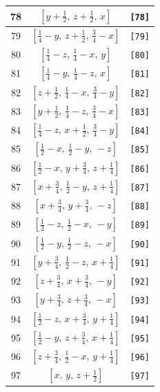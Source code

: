\documentclass[fleqn,8pt]{jsarticle}
\begin{document}
\begin{longtable}{ccc}
78 & $\left[ y + \frac{1}{2},\, z + \frac{1}{2},\, x \right]$ & {\tt [78]} \\ \hline
79 & $\left[ \frac{1}{4} - y,\, z + \frac{1}{2},\, \frac{3}{4} - x \right]$ & {\tt [79]} \\ \hline
80 & $\left[ \frac{1}{4} - z,\, \frac{1}{4} - x,\, y \right]$ & {\tt [80]} \\ \hline
81 & $\left[ \frac{1}{4} - y,\, \frac{1}{4} - z,\, x \right]$ & {\tt [81]} \\ \hline
82 & $\left[ z + \frac{1}{2},\, \frac{1}{4} - x,\, \frac{3}{4} - y \right]$ & {\tt [82]} \\ \hline
83 & $\left[ y + \frac{1}{2},\, \frac{1}{4} - z,\, \frac{3}{4} - x \right]$ & {\tt [83]} \\ \hline
84 & $\left[ \frac{1}{4} - z,\, x + \frac{1}{2},\, \frac{3}{4} - y \right]$ & {\tt [84]} \\ \hline
85 & $\left[ \frac{1}{2} - x,\, \frac{1}{2} - y,\, - z \right]$ & {\tt [85]} \\ \hline
86 & $\left[ \frac{1}{2} - x,\, y + \frac{3}{4},\, z + \frac{1}{4} \right]$ & {\tt [86]} \\ \hline
87 & $\left[ x + \frac{3}{4},\, \frac{1}{2} - y,\, z + \frac{1}{4} \right]$ & {\tt [87]} \\ \hline
88 & $\left[ x + \frac{3}{4},\, y + \frac{3}{4},\, - z \right]$ & {\tt [88]} \\ \hline
89 & $\left[ \frac{1}{2} - z,\, \frac{1}{2} - x,\, - y \right]$ & {\tt [89]} \\ \hline
90 & $\left[ \frac{1}{2} - y,\, \frac{1}{2} - z,\, - x \right]$ & {\tt [90]} \\ \hline
91 & $\left[ y + \frac{3}{4},\, \frac{1}{2} - z,\, x + \frac{1}{4} \right]$ & {\tt [91]} \\ \hline
92 & $\left[ z + \frac{3}{4},\, x + \frac{3}{4},\, - y \right]$ & {\tt [92]} \\ \hline
93 & $\left[ y + \frac{3}{4},\, z + \frac{3}{4},\, - x \right]$ & {\tt [93]} \\ \hline
94 & $\left[ \frac{1}{2} - z,\, x + \frac{3}{4},\, y + \frac{1}{4} \right]$ & {\tt [94]} \\ \hline
95 & $\left[ \frac{1}{2} - y,\, z + \frac{3}{4},\, x + \frac{1}{4} \right]$ & {\tt [95]} \\ \hline
96 & $\left[ z + \frac{3}{4},\, \frac{1}{2} - x,\, y + \frac{1}{4} \right]$ & {\tt [96]} \\ \hline
97 & $\left[ x,\, y,\, z + \frac{1}{2} \right]$ & {\tt [97]} \\ \hline

\end{longtable}
\end{document}
